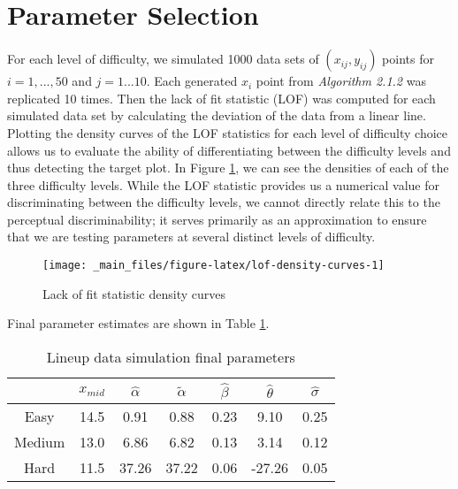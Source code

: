 \documentclass[print]{nuthesis}
\begin{document}
\hypertarget{parameter-selection}{%
\section{Parameter Selection}\label{parameter-selection}}

For each level of difficulty, we simulated 1000 data sets of \((x_{ij}, y_{ij})\) points for \(i = 1,...,50\) and \(j = 1...10\).
Each generated \(x_i\) point from \textit{Algorithm 2.1.2} was replicated 10 times. Then the lack of fit statistic (LOF) was computed for each simulated data set by calculating the deviation of the data from a linear line.
Plotting the density curves of the LOF statistics for each level of difficulty choice allows us to evaluate the ability of differentiating between the difficulty levels and thus detecting the target plot.
In Figure \ref{fig:lof-density-curves}, we can see the densities of each of the three difficulty levels.
While the LOF statistic provides us a numerical value for discriminating between the difficulty levels, we cannot directly relate this to the perceptual discriminability; it serves primarily as an approximation to ensure that we are testing parameters at several distinct levels of difficulty.

\begin{figure}

{\centering \texttt{[image: \_main\_files/figure-latex/lof-density-curves-1]} 

}

\caption{Lack of fit statistic density curves}\label{fig:lof-density-curves}
\end{figure}

Final parameter estimates are shown in Table \ref{tab:parameter-data}.

\begin{table}

\caption{\label{tab:parameter-data}Lineup data simulation final parameters}
\centering
\begin{tabular}[t]{ccccccc}
\toprule
 & $x_{mid}$ & $\hat\alpha$ & $\tilde\alpha$ & $\hat\beta$ & $\hat\theta$ & $\hat\sigma$\\
\midrule
Easy & 14.5 & 0.91 & 0.88 & 0.23 & 9.10 & 0.25\\
Medium & 13.0 & 6.86 & 6.82 & 0.13 & 3.14 & 0.12\\
Hard & 11.5 & 37.26 & 37.22 & 0.06 & -27.26 & 0.05\\
\bottomrule
\end{tabular}
\end{table}
\end{document}
